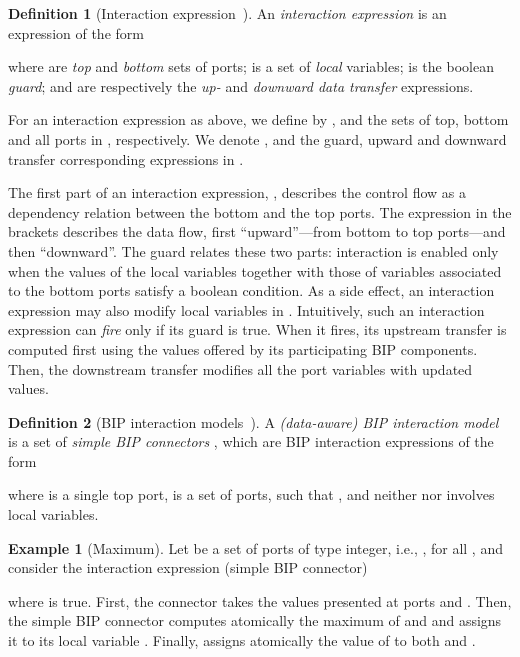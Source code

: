 \documentclass[submission,copyright,creativecommons,hidelinks]{eptcs}
\theoremstyle{plain} \newtheorem{theorem}{Theorem}
\theoremstyle{definition}
\newtheorem{definition}{Definition}
\newtheorem{example}{Example}
\theoremstyle{remark}
\newcommand\xqed[1]{\leavevmode\unskip\penalty9999 \hbox{}\nobreak\hfill
  \quad\hbox{#1}}
\newcommand\tri{\xqed{}}
\begin{document}
\begin{definition}[Interaction expression~\cite{BBJS14}]
  \label{defn:expression}
  An {\em interaction expression} is an expression of the form
  {
    
  }
  where
   are {\em top} and {\em bottom} sets of ports;
   is a set of {\em local} variables;
   is the boolean {\em guard};
   and  are respectively the {\em up-} and {\em
    downward data transfer} expressions.

  For an interaction expression  as above, we define by
  ,  and
   the sets of top, bottom and all
  ports in , respectively.  We denote ,  and
   the guard, upward and downward transfer corresponding expressions in .
\end{definition}

The first part of an interaction expression, , describes
the control flow as a dependency relation between the bottom and
the top ports.  The expression in the brackets describes the data flow, first ``upward''---from bottom to top ports---and then ``downward''.
The guard  relates these two parts:
interaction is enabled only when the values of the local variables together
with those of variables associated to the bottom ports satisfy a boolean
condition. As a side effect, an interaction expression may also
modify local variables in .
Intuitively, such an interaction expression can \emph{fire} only if its guard is true.
When it fires, its upstream transfer is computed first using the values offered by its participating BIP components.  Then, the downstream
transfer modifies all the port variables with updated values.

\begin{definition}[BIP interaction models~\cite{BBJS14}]
	A {\em (data-aware) BIP interaction model} is a set  of {\em simple BIP connectors} , which are BIP interaction expressions of the form

where  is a single top port,  is a set of ports, such that , and neither  nor  involves local variables.
\end{definition}

\begin{example}[Maximum]
\label{ex:maximum}
	Let  be a set of ports of type integer, i.e., , for all , and consider the interaction expression (simple BIP connector)

where  is true. First, the connector takes the values presented at ports  and . Then, the simple BIP connector  computes atomically the maximum of  and  and assigns it to its local variable . Finally,  assigns atomically the value of  to both  and .  
\tri\end{example}
\end{document}

